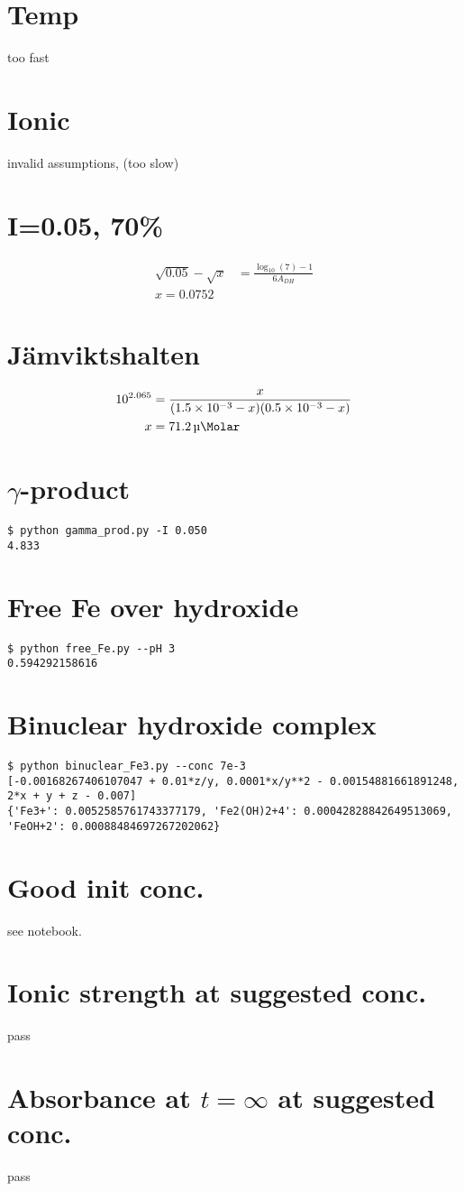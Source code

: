\documentclass{article}
\begin{document}
\section{Temp}
too fast

\section{Ionic}
invalid assumptions, (too slow)

\section{I=0.05, 70\%}
\begin{align}
\sqrt{0.05} - \sqrt{x} &= \frac{\log_{10}(7) - 1}{6A_{DH}} \\
x = 0.0752
\end{align}

\section{Jämviktshalten }
\begin{align}
10^{2.065} &= \frac{x}{(\num{1.5e-3} - x)(\num{0.5e-3} - x)} \\
x &= \SI{71.2}{\micro\Molar}
\end{align}

\section{$\gamma$-product}
\begin{verbatim}
$ python gamma_prod.py -I 0.050
4.833
\end{verbatim}

\section{Free Fe over hydroxide}
\begin{verbatim}
$ python free_Fe.py --pH 3
0.594292158616
\end{verbatim}

\section{Binuclear hydroxide complex}
\begin{verbatim}
$ python binuclear_Fe3.py --conc 7e-3
[-0.00168267406107047 + 0.01*z/y, 0.0001*x/y**2 - 0.00154881661891248, 2*x + y + z - 0.007]
{'Fe3+': 0.0052585761743377179, 'Fe2(OH)2+4': 0.00042828842649513069, 'FeOH+2': 0.00088484697267202062}
\end{verbatim}

\section{Good init conc.}
see notebook.

\section{Ionic strength at suggested conc.}
pass

\section{Absorbance at $t = \infty$ at suggested conc.}
pass
\end{document}

